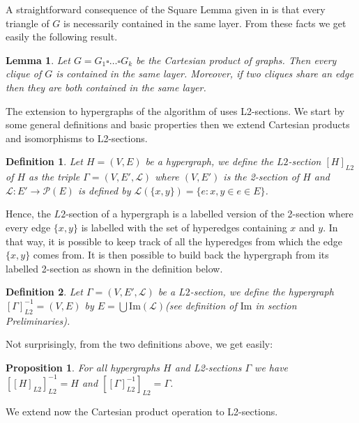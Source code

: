 \documentclass[copyright]{eptcs}
\newtheorem{Def}{Definition}
\newtheorem{Lem}{Lemma}
\newtheorem{Prop}{Proposition}
\newcommand{\mc}[1]{\mathcal{#1}}
\newcommand{\chg}[1]{{#1}}
\begin{document}
 A \chg{straightforward} consequence of the Square Lemma given in \cite{ImPe} is that every triangle of $G$ is necessarily contained in the same layer. From these facts we get easily the following result.

\begin{Lem}\label{LmCliqueInLayer} Let $G = G_1 \square \dotsc \square \chg{G_k}$ be the Cartesian product of graphs. Then every clique of $G$ is contained in the same layer. Moreover, if two cliques share an edge then they are both contained in the same layer.
\end{Lem}

The extension to hypergraphs of the algorithm of \cite{ImPe} uses L2-sections. We start by some general definitions and basic properties then we extend Cartesian products and isomorphisms to L2-sections.


\begin{Def}\label{DfL2Section} Let $H=(V,E)$ be a hypergraph, we define the $L2$-section $[H]_{L2}$ of $H$ as the triple $\Gamma =(V,E',\mc L)$ where  $(V,E')$ is the 2-section of $H$ and $\mc L : E' \rightarrow \mc P (E)$ is defined by $\mc L(\{x,y\}) = \{e: x,y \in e\in E\}$.\\
\end{Def}

Hence, the $L2$-section of a hypergraph is a labelled version of the 2-section where every edge $\{x,y\}$ is labelled with the set of hyperedges containing $x$ and $y$. In that way, it is possible to keep track of all the hyperedges from which the edge $\{x,y\}$ comes from. It is then possible to build back the hypergraph from its labelled 2-section as shown in the definition below.

\begin{Def}\label{DfL2SectionToHypergraph} Let $\Gamma = (V,E', \mc L)$ be a $L2$-section, we define the hypergraph $[\Gamma]^{-1}_{L2} = (V,E)$ by $E= \bigcup
\textrm{Im}(\mc L)$(see definition of $\textrm{Im}$ in section
Preliminaries).
\end{Def}

\noindent Not surprisingly, from the two definitions above, we get easily:

\begin{Prop}\label{PrInjectivityL2} For all hypergraphs $H$ and L2-sections $\Gamma$ we have
$[[H]_{L2}]_{L2}^{-1}=H$ and $[[\Gamma]^{-1}_{L2}]_{L2}= \Gamma$.
\end{Prop}

We extend now the Cartesian product operation to L2-sections.
\end{document}
